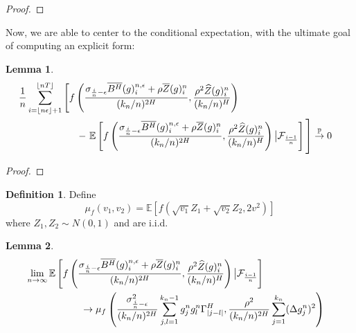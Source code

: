 \documentclass[12pt,letterpaper]{article}
\newtheorem{lemma}{Lemma}
\theoremstyle{definition}
\newtheorem*{definition}{Definition}
\newcommand{\E}{\mathbb{E}}
\begin{document}
\begin{proof}

\end{proof}

Now, we are able to center to the conditional expectation, with the ultimate goal of computing an explicit form:
\begin{lemma}
  \begin{align}
    \phantom{}
    &\begin{aligned}
      \mathllap{} &\frac{1}{n}\sum_{i = \left\lfloor n\epsilon \right\rfloor + 1}^{\left\lfloor nT \right\rfloor} \left[ \vphantom{\E \left[ f\left( \frac{\sigma_{\frac{i}{n}-\epsilon}\overline{B^H}(g)^{n,\epsilon}_i + \rho\overline{Z}(g)^n_i}{(k_n/n)^{2H}}, \frac{\rho^2\widehat{Z}(g)^n_i}{(k_n/n)^H}\right) \right] } f\left( \frac{\sigma_{\frac{i}{n}-\epsilon}\overline{B^H}(g)^{n,\epsilon}_i + \rho\overline{Z}(g)^n_i}{(k_n/n)^{2H}}, \frac{\rho^2\widehat{Z}(g)^n_i}{(k_n/n)^H}\right) \right. \\ &\hspace*{2.1cm} - \left. \E\left[ f\left( \frac{\sigma_{\frac{i}{n}-\epsilon}\overline{B^H}(g)^{n,\epsilon}_i + \rho\overline{Z}(g)^n_i}{(k_n/n)^{2H}}, \frac{\rho^2\widehat{Z}(g)^n_i}{(k_n/n)^H}\right) \big| \mathcal{F}_{\frac{i-1}{n}} \right] \vphantom{\frac{1}{n}\sum_{i = \left\lfloor n\epsilon \right\rfloor + 1}^{\left\lfloor nT \right\rfloor}} \right] \overset{\mathbb{P}}{\rightarrow} 0
    \end{aligned}
  \end{align}
\end{lemma}

\begin{proof}

\end{proof}

\begin{definition}
  Define
  \begin{equation}
    \mu_f(v_1, v_2) = \E\left[ f(\sqrt{v_1}Z_1 + \sqrt{v_2}Z_2, 2v^2) \right]
  \end{equation}
  where \(Z_1, Z_2 \sim N(0,1)\) and are i.i.d.
\end{definition}

\begin{lemma}
  \begin{align}
    \phantom{}
    &\begin{aligned}
      \mathllap{} &\lim_{n \rightarrow \infty} \E\left[ f\left( \frac{\sigma_{\frac{i}{n}-\epsilon}\overline{B^H}(g)^{n,\epsilon}_i + \rho\overline{Z}(g)^n_i}{(k_n/n)^{2H}}, \frac{\rho^2\widehat{Z}(g)^n_i}{(k_n/n)^H}\right) \big| \mathcal{F}_{\frac{i-1}{n}} \right] \\
                  &\hspace*{2cm} \rightarrow \mu_f\left( \frac{\sigma^2_{\frac{i}{n}-\epsilon}}{(k_n/n)^{2H}}\sum_{j,l = 1}^{k_n-1} g^n_jg^n_l\Gamma^H_{|j-l|}, \frac{\rho^2}{(k_n/n)^{2H}}\sum_{j=1}^{k_n}(\Delta g^n_j)^2 \right)
    \end{aligned}
  \end{align}
\end{lemma}
\end{document}
